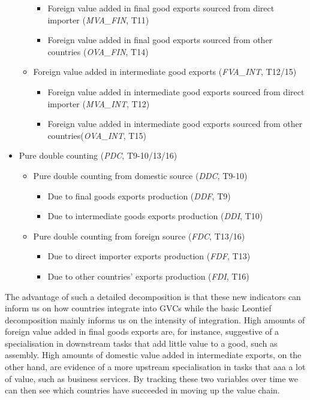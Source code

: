 \documentclass[11pt,a4paper]{article}
\begin{document}
\begin{itemize}
\begin{itemize}
\begin{itemize}
\item Foreign value added in final good exports sourced from direct importer (\textit{MVA\_FIN}, T11)
\item Foreign value added in final good exports sourced from other countries (\textit{OVA\_FIN}, T14)
\end{itemize}
\item Foreign value added in intermediate good exports (\textit{FVA\_INT}, T12/15)
\begin{itemize}
\item Foreign value added in intermediate good exports sourced from direct importer (\textit{MVA\_INT}, T12)
\item Foreign value added in intermediate good exports sourced from other countries(\textit{OVA\_INT}, T15)
\end{itemize}
\end{itemize}
\item Pure double counting (\textit{PDC}, T9-10/13/16)
\begin{itemize}
\item Pure double counting from domestic source (\textit{DDC}, T9-10)
\begin{itemize}
\item Due to final goods exports production (\textit{DDF}, T9)
\item Due to intermediate goods exports production (\textit{DDI}, T10)
\end{itemize}
\item Pure double counting from foreign source (\textit{FDC}, T13/16)
\begin{itemize}
\item Due to direct importer exports production (\textit{FDF}, T13)
\item Due to other countries' exports production (\textit{FDI}, T16)
\end{itemize}
\end{itemize}
\end{itemize}

The advantage of such a detailed decomposition is that these new indicators can inform us on how countries integrate into GVCs while the basic Leontief decomposition mainly informs us on the intensity of integration. High amounts of foreign value added in final goods exports are, for instance, suggestive of a specialisation in downstream tasks that add little value to a good, such as assembly. High amounts of domestic value added in intermediate exports, on the other hand, are evidence of a more upstream specialisation in tasks that aaa a lot of value, such as business services. By tracking these two variables over time we can then see which countries have succeeded in moving up the value chain.
\end{document}
